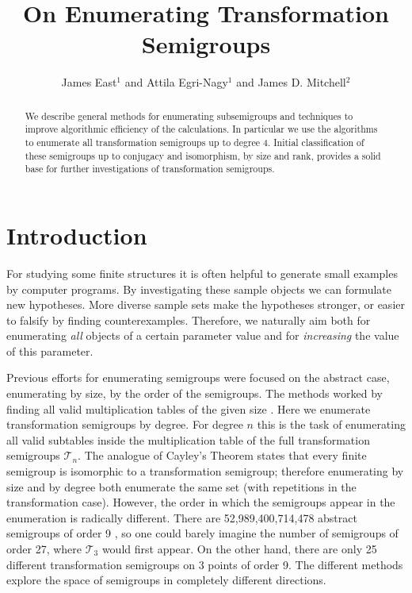 \documentclass{amsart}
\newcommand{\cT}{{\mathcal T}}
\theoremstyle{plain}
\theoremstyle{definition}
\begin{document}
\title{On Enumerating Transformation Semigroups}
\author[J. East, A. Egri-Nagy, J.D. Mitchell]{James East$^1$ and Attila Egri-Nagy$^{1}$ and James D. Mitchell$^2$}
\address{$^1$Centre for Research in Mathematics, School of Computing, Engineering and Mathematics, University of Western Sydney (Parramatta Campus), Locked Bag 1797, Penrith, NSW 2751, Australia}
\address{$^2$ Mathematical Institute, University of St Andrews, North Haugh, St Andrews, Fife, KY16 9SS, Scotland}
\maketitle
\begin{abstract}
We describe general methods for enumerating subsemigroups and techniques to improve algorithmic efficiency of the calculations.
In particular we use the algorithms to enumerate all transformation semigroups up to degree 4.
Initial classification of these semigroups up to conjugacy and isomorphism, by size and rank, provides a solid base for further investigations of transformation semigroups.
\end{abstract}
\tableofcontents
\section{Introduction}
For studying some finite structures  it is often helpful to generate small examples by computer programs.
By investigating these sample objects we can formulate new hypotheses.
More diverse sample sets make the hypotheses stronger, or easier to falsify by finding counterexamples.
Therefore, we naturally aim both for enumerating \emph{all} objects of a certain parameter value and for \emph{increasing} the value of this parameter.

Previous efforts for enumerating semigroups were focused on the abstract case, enumerating by size, by the order of the semigroups.
The methods worked by finding all valid multiplication tables of the given size \cite{monoidenum2009,For55,JW77,KRS76,Ple67,SZT94,tamura2,tamura1}.
Here we enumerate transformation semigroups by degree.
For degree $n$ this is the task of enumerating all valid subtables inside the multiplication table of the  full transformation semigroups $\cT_n$.
The analogue of Cayley's Theorem states that every finite semigroup is isomorphic to a transformation semigroup; therefore enumerating by size and by degree both enumerate the same set (with repetitions in the transformation case).
However, the order in which the semigroups appear in the enumeration is radically different.
There are 52,989,400,714,478 abstract semigroups of order 9 \cite{monoidenum2009}, so one could barely imagine the number of semigroups of order 27, where $\cT_3$ would first appear.
On the other hand, there are only 25 different transformation semigroups on 3 points of order 9.
The different methods explore the space of semigroups in completely different directions.
\end{document}

